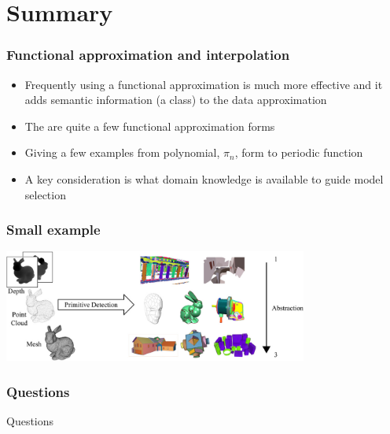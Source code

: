 \documentclass[10pt]{beamer}
\begin{document}
\section{Summary}

\begin{frame}
  \frametitle{Functional approximation and interpolation}
  \begin{itemize}
  \item Frequently using a functional approximation is much more
    effective and it adds semantic information (a class) to the data
    approximation
  \item The are quite a few functional approximation forms
  \item Giving a few examples from polynomial, $\pi_n$, form to periodic function
  \item A key consideration is what domain knowledge is available to guide model selection
  \end{itemize}
\end{frame}

\begin{frame}
  \frametitle{Small example}
  \centerline{\includegraphics[width=10cm]{primitives}}
\end{frame}

\begin{frame}
  \frametitle{Questions}
  \centerline{\Huge Questions}
\end{frame}
\end{document}
